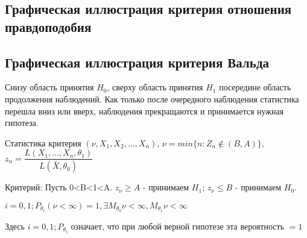 \subsection{Графическая иллюстрация критерия отношения правдоподобия}


\subsection{Графическая иллюстрация критерия Вальда}


Снизу область принятия $H_0$, сверху область принятия $H_1$ посередине область продолжения наблюдений. Как только после очередного наблюдения статистика перешла вниз или вверх, наблюдения прекращаются и принимается нужная гипотеза.

Статистика критерия $(\nu, X_1, X_2, \dots, X_n)$,
$\nu = min \{ n : Z_n \notin (B, A) \}$,
$z_n = \dfrac{L(X_1, \dots, X_n, \theta_1)}{L(\bar X, \theta_0)}$

Критерий: Пусть 0<B<1<A.
$z_\nu \geqslant A$ - принимаем $H_1$; $z_\nu \leqslant B$ - принимаем $H_0$.

\begin{theorem}
  $i = 0, 1; P_{\theta_i}(\nu < \infty) = 1, \exists M_{\theta_0} \nu < \infty, M_{\theta_1} \nu < \infty$

  Здесь $i = 0, 1; P_{\theta_i}$ означает, что при любой верной гипотезе эта вероятность $=1$
\end{theorem}

